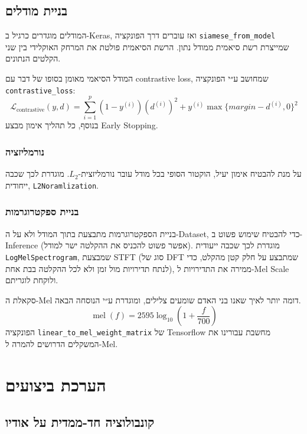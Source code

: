 \documentclass[a4paper]{article}
\begin{document}
\subsection{בניית מודלים}
\label{sec:code-modelling}

המודלים מוגדרים כרגיל ב-Keras, ואז עוברים דרך הפונקציה
\texttt{siamese\_from\_model} שמייצרת רשת סיאמית ממודל נתון. הרשת
הסיאמית פולטת את המרחק האוקלידי בין שני הקלטים הנתונים.

המודל הסיאמי מאומן בסופו של דבר עם contrastive loss, שמחושב ע״י הפונקציה \texttt{contrastive\_loss}:
\[
  \mathcal{L}_{\text{contrastive}}(y, d) = \sum_{i=1}^p (1-y^{(i)}) (d^{(i)})^2 + y^{(i)} \max\{ \textit{margin} - d^{(i)}, 0 \}^2
\]
בנוסף, כל תהליך אימון מבצע Early Stopping.

\subsubsection{נורמליזציה}
\label{sec:code-model-normalization}

על מנת להבטיח אימון יעיל, הוקטור הסופי בכל מודל עובר נורמליזצית-$L_2$.
מוגדרת לכך שכבה ייחודית, \texttt{L2Noramlization}.

\subsubsection{בניית ספקטרוגרמות}
\label{sec:code-model-spectro}

בניית הספקטרוגרמות מתבצעת בתוך המודל ולא על ה-Dataset, כדי להבטיח
שימוש פשוט ב-Inference (אפשר פשוט להכניס את ההקלטה ישר למודל). מוגדרת
לכך שכבה ייעודית \texttt{LogMelSpectrogram}, שמבצעת STFT (סוג של DFT
שמתבצע על חלק קטן מהקלט, כדי לנתח תדירויות מול זמן ולא לכל ההקלטה בבת
אחת), ממירה את התדירויות ל-Mel Scale ולוקחת לוגריתם.

סקאלת ה-Mel דומה יותר לאיך שאנו בני האדם שומעים צלילים, ומוגדרת ע״י הנוסחה הבאה.
\[
  \mathop{mel}(f) = 2595 \log_{10}\left( 1 + \frac{f}{700} \right)
\]
הפונקציה \texttt{linear\_to\_mel\_weight\_matrix} של Tensorflow מחשבת
עבורינו את המשקלים הדרושים להמרה ל-Mel.

\section{הערכת ביצועים}
\label{sec:performance}

\subsection{קונבולוציה חד-ממדית על אודיו}
\end{document}
